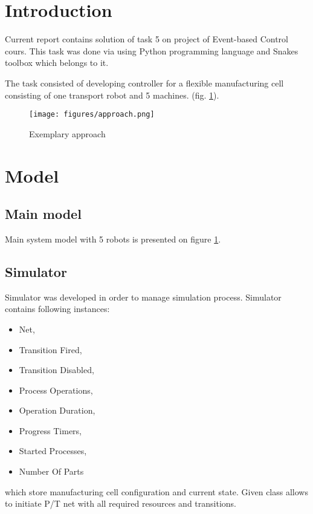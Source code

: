 





\TitlePage

\section*{Introduction}
Current report contains solution of task 5 on project of Event-based Control cours. This task was done via using Python programming language and Snakes toolbox which belongs to it. 

The task consisted of developing controller for a flexible manufacturing cell consisting of
one transport robot and 5 machines. (fig. \ref{approach}). 
		\begin{figure}[!tp]
		\centering
		\texttt{[image: figures/approach.png]}
		\caption{Exemplary approach \label{approach}}
		\end{figure}
			
\section{Model}
\subsection{Main model}
Main system model with 5 robots is presented on figure \ref{approach}.
		
\subsection{Simulator}
Simulator was developed in order to manage simulation process. 
Simulator contains following instances:
\begin{itemize}
\item Net,
\item Transition Fired,
\item Transition Disabled, 
\item Process Operations, 
\item Operation Duration, 
\item Progress Timers, 
\item Started Processes, 
\item Number Of Parts 
\end{itemize}
which store manufacturing cell configuration and current state. Given class allows to initiate P/T net with all required resources and transitions.
					
